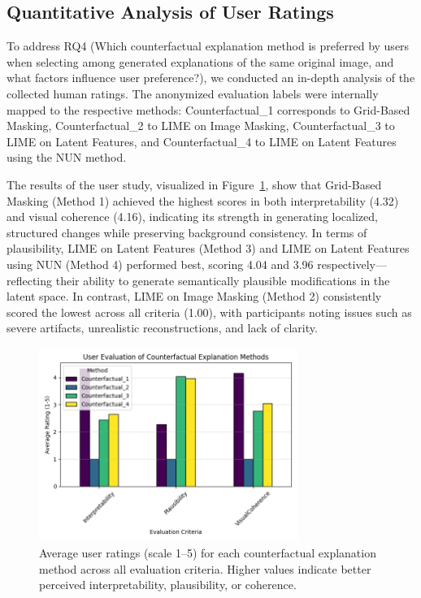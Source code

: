 \subsection{Quantitative Analysis of User Ratings} \label{subsubsec:quantitative_analysis_of_user_ratings}

To address RQ4 (Which counterfactual explanation method is preferred by users when selecting among generated explanations of the same original image, and what factors influence user preference?), we conducted an in-depth analysis of the collected human ratings. The anonymized evaluation labels were internally mapped to the respective methods: Counterfactual\_1 corresponds to Grid-Based Masking, Counterfactual\_2 to LIME on Image Masking, Counterfactual\_3 to LIME on Latent Features, and Counterfactual\_4 to LIME on Latent Features using the NUN method.

The results of the user study, visualized in Figure~\ref{fig:bar_plot_user_eval}, show that Grid-Based Masking (Method 1) achieved the highest scores in both interpretability (4.32) and visual coherence (4.16), indicating its strength in generating localized, structured changes while preserving background consistency. In terms of plausibility, LIME on Latent Features (Method 3) and LIME on Latent Features using NUN (Method 4) performed best, scoring 4.04 and 3.96 respectively—reflecting their ability to generate semantically plausible modifications in the latent space. In contrast, LIME on Image Masking (Method 2) consistently scored the lowest across all criteria (1.00), with participants noting issues such as severe artifacts, unrealistic reconstructions, and lack of clarity.

\begin{figure}[htbp]
    \centering
    \includegraphics[width=0.75\textwidth]{img/human_rating_results/bar_plot_user_evaluations.png}
    \caption[Bar plot of average user ratings for CE methods]{%
Average user ratings (scale 1–5) for each counterfactual explanation method across all evaluation criteria. Higher values indicate better perceived interpretability, plausibility, or coherence.}
    \label{fig:bar_plot_user_eval}
\end{figure}



